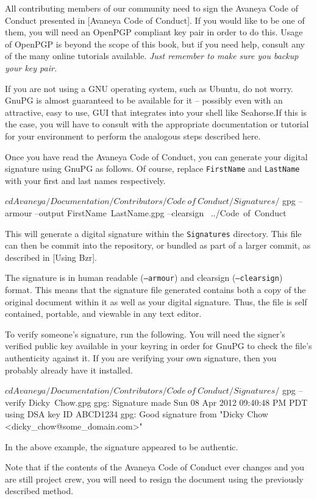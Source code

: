 

All contributing members of our community need to sign the Avaneya Code of Conduct presented in [Avaneya Code of Conduct]. If you would like to be one of them, you will need an OpenPGP compliant key pair in order to do this. Usage of OpenPGP is beyond the scope of this book, but if you need help, consult any of the many online tutorials available. {\it Just remember to make sure you backup your key pair.}

If you are not using a GNU operating system, such as Ubuntu, do not worry. GnuPG is almost guaranteed to be available for it -- possibly even with an attractive, easy to use, GUI that integrates into your shell like Seahorse.\footnotecite[seahorse] If this is the case, you will have to consult with the appropriate documentation or tutorial for your environment to perform the analogous steps described here.

Once you have read the Avaneya Code of Conduct, you can generate your digital signature using GnuPG as follows. Of course, replace {\tt FirstName} and {\tt LastName} with your first and last names respectively.

\startCodeExample
$ cd Avaneya/Documentation/Contributors/Code\ of\ Conduct/Signatures/
$ gpg --armour --output FirstName\ LastName.gpg --clearsign \
    ../Code\ of\ Conduct
\stopCodeExample

This will generate a digital signature within the {\tt Signatures} directory. This file can then be commit into the repository, or bundled as part of a larger commit, as described in [Using Bzr]. 

The signature is in human readable ({\tt --armour}) and clearsign ({\tt --clearsign}) format. This means that the signature file generated contains both a copy of the original document within it as well as your digital signature. Thus, the file is self contained, portable, and viewable in any text editor.

To verify someone's signature, run the following. You will need the signer's verified public key available in your keyring in order for GnuPG to check the file's authenticity against it. If you are verifying your own signature, then you probably already have it installed.

\startCodeExample
$ cd Avaneya/Documentation/Contributors/Code\ of\ Conduct/Signatures/
$ gpg --verify Dicky\ Chow.gpg 
gpg: Signature made Sun 08 Apr 2012 09:40:48 PM PDT using DSA key ID ABCD1234
gpg: Good signature from "Dicky Chow <dicky_chow@some_domain.com>"
\stopCodeExample

In the above example, the signature appeared to be authentic.

Note that if the contents of the Avaneya Code of Conduct ever changes and you are still project crew, you will need to resign the document using the previously described method.

